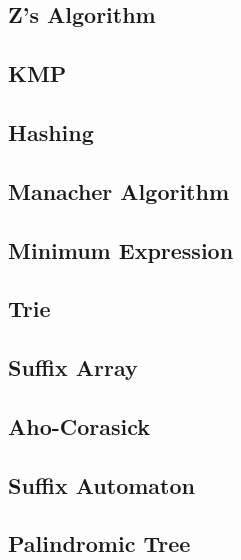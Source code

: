 \subsection{Z's Algorithm}
\raggedbottom
\hrulefill
\subsection{KMP}
\raggedbottom
\hrulefill
\subsection{Hashing}
\raggedbottom
\hrulefill
\subsection{Manacher Algorithm}
\raggedbottom
\hrulefill
\subsection{Minimum Expression}
\raggedbottom
\hrulefill
\subsection{Trie}
\raggedbottom
\hrulefill
\subsection{Suffix Array}
\raggedbottom
\hrulefill
\subsection{Aho-Corasick}
\raggedbottom
\hrulefill
\subsection{Suffix Automaton}
\raggedbottom
\hrulefill
\subsection{Palindromic Tree}
\raggedbottom
\hrulefill
